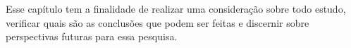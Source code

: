 Esse capítulo tem a finalidade de realizar uma consideração sobre todo estudo, verificar quais são as conclusões que podem ser feitas e discernir sobre perspectivas futuras para essa pesquisa.